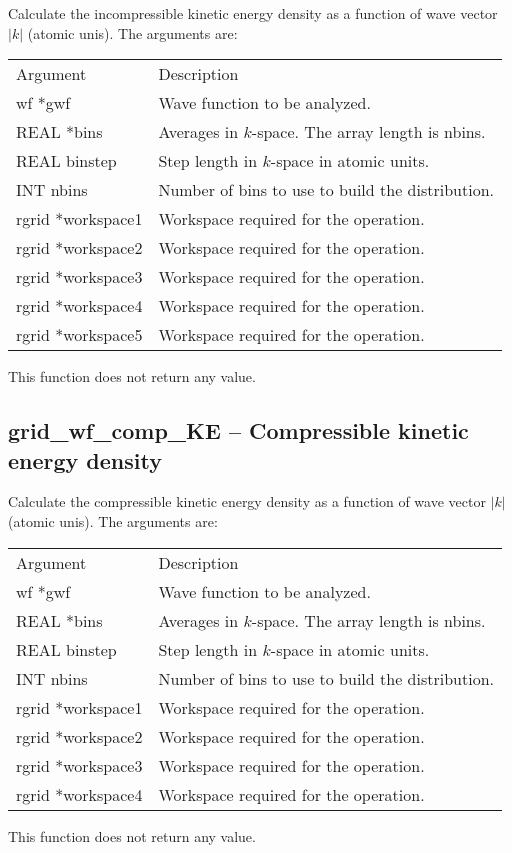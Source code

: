 \documentclass[12pt,letterpaper]{report}
\begin{document}
Calculate the incompressible kinetic energy density as a function of wave vector $\left|k\right|$ (atomic unis). The arguments are:
\begin{longtable}{p{} p{}}
Argument & Description\\
\cline{1-2}
wf *gwf & Wave function to be analyzed.\\
REAL *bins & Averages in $k$-space. The array length is nbins.\\
REAL binstep & Step length in $k$-space in atomic units.\\
INT nbins & Number of bins to use to build the distribution.\\
rgrid *workspace1 & Workspace required for the operation.\\
rgrid *workspace2 & Workspace required for the operation.\\
rgrid *workspace3 & Workspace required for the operation.\\
rgrid *workspace4 & Workspace required for the operation.\\
rgrid *workspace5 & Workspace required for the operation.\\
\end{longtable}
\noindent
This function does not return any value.

\subsection{grid\_wf\_comp\_KE -- Compressible kinetic energy density}

Calculate the compressible kinetic energy density as a function of wave vector $\left|k\right|$ (atomic unis). The arguments are:
\begin{longtable}{p{} p{}}
Argument & Description\\
\cline{1-2}
wf *gwf & Wave function to be analyzed.\\
REAL *bins & Averages in $k$-space. The array length is nbins.\\
REAL binstep & Step length in $k$-space in atomic units.\\
INT nbins & Number of bins to use to build the distribution.\\
rgrid *workspace1 & Workspace required for the operation.\\
rgrid *workspace2 & Workspace required for the operation.\\
rgrid *workspace3 & Workspace required for the operation.\\
rgrid *workspace4 & Workspace required for the operation.\\
\end{longtable}
\noindent
This function does not return any value.
\end{document}
